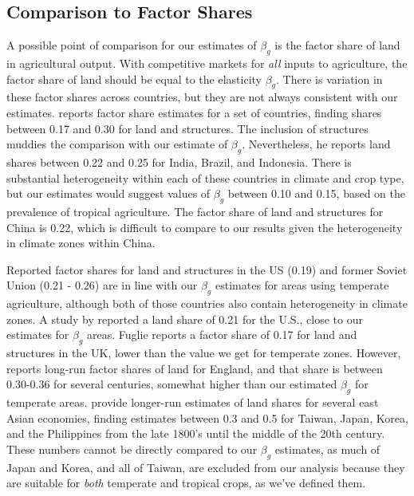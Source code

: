 \documentclass[11pt]{article}
\begin{document}
\subsection{Comparison to Factor Shares}
A possible point of comparison for our estimates of $\beta_g$ is the factor share of land in agricultural output. With competitive markets for \textit{all} inputs to agriculture, the factor share of land should be equal to the elasticity $\beta_g$. There is variation in these factor shares across countries, but they are not always consistent with our estimates. \citet{fuglie2010} reports factor share estimates for a set of countries, finding shares between 0.17 and 0.30 for land and structures. The inclusion of structures muddies the comparison with our estimate of $\beta_g$. Nevertheless, he reports land shares between 0.22 and 0.25 for India, Brazil, and Indonesia. There is substantial heterogeneity within each of these countries in climate and crop type, but our estimates would suggest values of $\beta_g$ between 0.10 and 0.15, based on the prevalence of tropical agriculture. The factor share of land and structures for China is 0.22, which is difficult to compare to our results given the heterogeneity in climate zones within China.

Reported factor shares for land and structures in the US (0.19) and former Soviet Union (0.21 - 0.26) are in line with our $\beta_g$ estimates for areas using temperate agriculture, although both of those countries also contain heterogeneity in climate zones. A study by \citet{jg1992} reported a land share of 0.21 for the U.S., close to our estimates for $\beta_g$ areas. Fuglie reports a factor share of 0.17 for land and structures in the UK, lower than the value we get for temperate zones. However, \citet{Clark2002} reports long-run factor shares of land for England, and that share is between 0.30-0.36 for several centuries, somewhat higher than our estimated $\beta_g$ for temperate areas. \citet{hrs1979} provide longer-run estimates of land shares for several east Asian economies, finding estimates between 0.3 and 0.5 for Taiwan, Japan, Korea, and the Philippines from the late 1800's until the middle of the 20th century. These numbers cannot be directly compared to our $\beta_g$ estimates, as much of Japan and Korea, and all of Taiwan, are excluded from our analysis because they are suitable for \textit{both} temperate and tropical crops, as we've defined them. 
\end{document}
